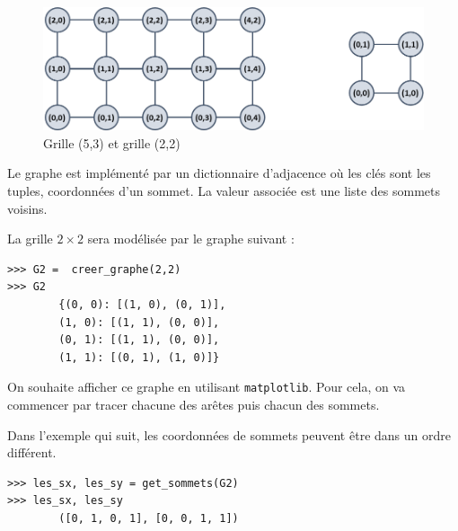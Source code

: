 \begin{figure}[!h]
\centering
\includegraphics[width=12cm]{fig_01}
\caption{Grille (5,3) et grille (2,2)}
\end{figure}

Le graphe est implémenté par un dictionnaire d'adjacence où les clés sont les tuples, coordonnées d'un sommet. La valeur associée est une liste des sommets voisins. 



\begin{exemple}
La grille $ 2 \times 2$ sera modélisée par le graphe suivant :
\end{exemple}

\begin{lstlisting}
>>> G2 =  creer_graphe(2,2)
>>> G2
        {(0, 0): [(1, 0), (0, 1)],
        (1, 0): [(1, 1), (0, 0)],
        (0, 1): [(1, 1), (0, 0)],
        (1, 1): [(0, 1), (1, 0)]}
\end{lstlisting}

On souhaite afficher ce graphe en utilisant \lstinline{matplotlib}. Pour cela, on va commencer par tracer chacune des arêtes puis chacun des sommets. 

\begin{exemple}
Dans l'exemple qui suit, les coordonnées de sommets peuvent être dans un ordre différent. 

\end{exemple}

\begin{lstlisting}
>>> les_sx, les_sy = get_sommets(G2)
>>> les_sx, les_sy
        ([0, 1, 0, 1], [0, 0, 1, 1])
\end{lstlisting}


